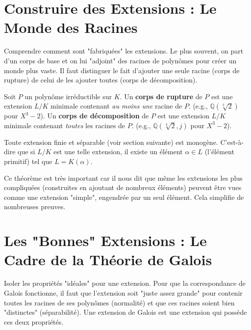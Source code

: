 \section{Construire des Extensions : Le Monde des Racines}

\begin{objectif}
    Comprendre comment sont "fabriquées" les extensions. Le plus souvent, on part d'un corps de base et on lui "adjoint" des racines de polynômes pour créer un monde plus vaste. Il faut distinguer le fait d'ajouter une seule racine (corps de rupture) de celui de les ajouter toutes (corps de décomposition).
\end{objectif}

\begin{definition}
    Soit $P$ un polynôme irréductible sur $K$.
    Un \textbf{corps de rupture} de $P$ est une extension $L/K$ minimale contenant \textit{au moins une} racine de $P$. (e.g., $\mathbb{Q}(\sqrt[3]{2})$ pour $X^3-2$).
    Un \textbf{corps de décomposition} de $P$ est une extension $L/K$ minimale contenant \textit{toutes} les racines de $P$. (e.g., $\mathbb{Q}(\sqrt[3]{2}, j)$ pour $X^3-2$).
\end{definition}

\begin{theorem}
    Toute extension finie et séparable (voir section suivante) est monogène. C'est-à-dire que si $L/K$ est une telle extension, il existe un élément $\alpha \in L$ (l'élément primitif) tel que $L=K(\alpha)$.
\end{theorem}

\begin{remark}
    Ce théorème est très important car il nous dit que même les extensions les plus compliquées (construites en ajoutant de nombreux éléments) peuvent être vues comme une extension "simple", engendrée par un seul élément. Cela simplifie de nombreuses preuves.
\end{remark}

\section{Les "Bonnes" Extensions : Le Cadre de la Théorie de Galois}

\begin{objectif}
    Isoler les propriétés "idéales" pour une extension. Pour que la correspondance de Galois fonctionne, il faut que l'extension soit "juste assez grande" pour contenir toutes les racines de ses polynômes (normalité) et que ces racines soient bien "distinctes" (séparabilité). Une extension de Galois est une extension qui possède ces deux propriétés.
\end{objectif}

